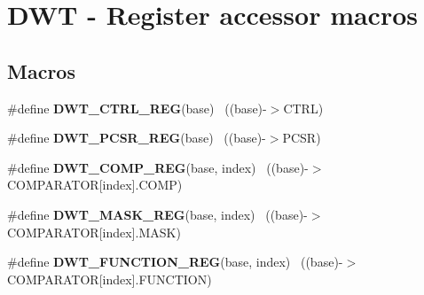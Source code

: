 \hypertarget{group___d_w_t___register___accessor___macros}{}\section{D\+W\+T -\/ Register accessor macros}
\label{group___d_w_t___register___accessor___macros}
\subsection*{Macros}
\begin{DoxyCompactItemize}
\item 
\hypertarget{group___d_w_t___register___accessor___macros_ga805e8330d1aa986d534abe1eed2614df}{}\#define {\bfseries D\+W\+T\+\_\+\+C\+T\+R\+L\+\_\+\+R\+E\+G}(base)                                          ~((base)-\/$>$C\+T\+R\+L)\label{group___d_w_t___register___accessor___macros_ga805e8330d1aa986d534abe1eed2614df}

\item 
\hypertarget{group___d_w_t___register___accessor___macros_ga19fcf102babeb34ec17bc96dd4d08e52}{}\#define {\bfseries D\+W\+T\+\_\+\+P\+C\+S\+R\+\_\+\+R\+E\+G}(base)                                          ~((base)-\/$>$P\+C\+S\+R)\label{group___d_w_t___register___accessor___macros_ga19fcf102babeb34ec17bc96dd4d08e52}

\item 
\hypertarget{group___d_w_t___register___accessor___macros_gad03eebac5bf5c3c3e461e156ba6e37ae}{}\#define {\bfseries D\+W\+T\+\_\+\+C\+O\+M\+P\+\_\+\+R\+E\+G}(base,  index)                              ~((base)-\/$>$C\+O\+M\+P\+A\+R\+A\+T\+O\+R\mbox{[}index\mbox{]}.C\+O\+M\+P)\label{group___d_w_t___register___accessor___macros_gad03eebac5bf5c3c3e461e156ba6e37ae}

\item 
\hypertarget{group___d_w_t___register___accessor___macros_ga16461875f56f3b91ee27a53a9f4dbc78}{}\#define {\bfseries D\+W\+T\+\_\+\+M\+A\+S\+K\+\_\+\+R\+E\+G}(base,  index)                              ~((base)-\/$>$C\+O\+M\+P\+A\+R\+A\+T\+O\+R\mbox{[}index\mbox{]}.M\+A\+S\+K)\label{group___d_w_t___register___accessor___macros_ga16461875f56f3b91ee27a53a9f4dbc78}

\item 
\hypertarget{group___d_w_t___register___accessor___macros_gaedc0f311fdf85789a988b58375481265}{}\#define {\bfseries D\+W\+T\+\_\+\+F\+U\+N\+C\+T\+I\+O\+N\+\_\+\+R\+E\+G}(base,  index)                      ~((base)-\/$>$C\+O\+M\+P\+A\+R\+A\+T\+O\+R\mbox{[}index\mbox{]}.F\+U\+N\+C\+T\+I\+O\+N)\label{group___d_w_t___register___accessor___macros_gaedc0f311fdf85789a988b58375481265}


\end{DoxyCompactItemize}

